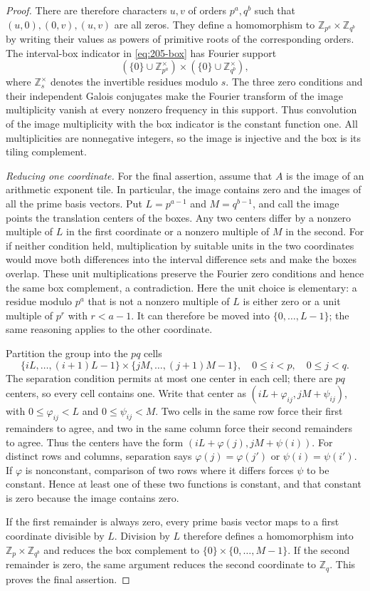 \documentclass[11pt,reqno]{amsart}
\newcommand{\Z}{\mathbb Z}
\theoremstyle{definition}
\theoremstyle{remark}
\numberwithin{equation}{section}
\begin{document}
\begin{proof}
There are therefore characters $u,v$ of orders $p^a,q^b$ such that
$(u,0),(0,v),(u,v)$ are all zeros. They define a homomorphism to
$\Z_{p^a}\times\Z_{q^b}$ by writing their values as powers of primitive
roots of the corresponding orders.
The interval-box indicator in \eqref{eq:205-box} has Fourier support
\[
 (\{0\}\cup\Z_{p^a}^{\times})\times
 (\{0\}\cup\Z_{q^b}^{\times}),
\]
where $\Z_s^{\times}$ denotes the invertible residues modulo $s$.
The three zero conditions and their independent Galois conjugates
make the Fourier transform of the image multiplicity vanish at every
nonzero frequency in this support.
Thus convolution of the image multiplicity with the box indicator is
the constant function one. All multiplicities are nonnegative integers,
so the image is injective and the box is its tiling complement.

\emph{Reducing one coordinate.}
For the final assertion, assume that $A$ is the image of an arithmetic
exponent tile. In particular, the image contains zero and the images
of all the prime basis vectors.
Put $L=p^{a-1}$ and $M=q^{b-1}$, and call the image points the
translation centers of the boxes. Any two centers differ by a nonzero
multiple of $L$ in the first coordinate or a nonzero multiple of $M$
in the second. For if neither condition held, multiplication by suitable
units in the two coordinates would move both differences into the
interval difference sets and make the boxes overlap. These unit
multiplications preserve the Fourier zero conditions and hence the same
box complement, a contradiction.
Here the unit choice is elementary: a residue modulo $p^a$ that is
not a nonzero multiple of $L$ is either zero or a unit multiple of
$p^r$ with $r<a-1$. It can therefore be moved into
$\{0,\ldots,L-1\}$; the same reasoning applies to the other coordinate.

Partition the group into the $pq$ cells
\[
 \{iL,\ldots,(i+1)L-1\}\times
 \{jM,\ldots,(j+1)M-1\},
 \quad 0\le i<p,\quad 0\le j<q.
\]
The separation condition permits at most one center in each cell;
there are $pq$ centers, so every cell contains one. Write that center
as $(iL+\varphi_{ij},jM+\psi_{ij})$, with
$0\le\varphi_{ij}<L$ and $0\le\psi_{ij}<M$.
Two cells in the same row force their first remainders to agree, and
two in the same column force their second remainders to agree.
Thus the centers have the form
$(iL+\varphi(j),jM+\psi(i))$.
For distinct rows and columns, separation says
$\varphi(j)=\varphi(j')$ or $\psi(i)=\psi(i')$.
If $\varphi$ is nonconstant, comparison of two rows where it differs
forces $\psi$ to be constant. Hence at least one of these two functions
is constant, and that constant is zero because the image contains zero.

If the first remainder is always zero, every prime basis vector maps
to a first coordinate divisible by $L$. Division by $L$ therefore
defines a homomorphism into $\Z_p\times\Z_{q^b}$ and reduces the box
complement to $\{0\}\times\{0,\ldots,M-1\}$. If the second remainder
is zero, the same argument reduces the second coordinate to $\Z_q$.
This proves the final assertion.
\end{proof}
\end{document}
